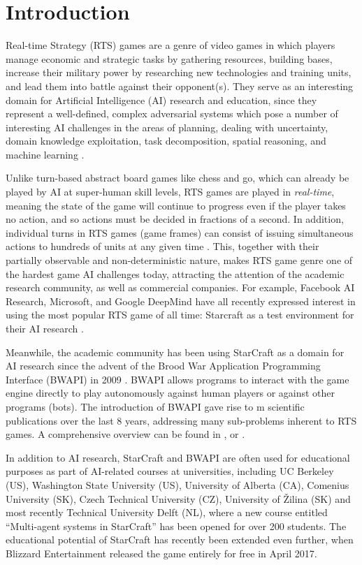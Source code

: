 \section{Introduction}\label{secIntro}

Real-time Strategy (RTS) games are a genre of video games in which players manage economic and strategic tasks by gathering resources, building bases, increase their military power by researching new technologies and training units, and lead them into battle against their opponent(s). They serve as an interesting domain for Artificial Intelligence (AI) research and education, since they represent a well-defined, complex adversarial systems \cite{Buro2004} which pose a number of interesting AI challenges in the areas of planning, dealing with uncertainty, domain knowledge exploitation, task decomposition, spatial reasoning, and machine learning \cite{Survey2013}.

Unlike turn-based abstract board games like chess and go, which can already be played by AI at super-human skill levels, RTS games are played in \textit{real-time}, meaning the state of the game will continue to progress even if the player takes no action, and so actions must be decided in fractions of a second. In addition, individual turns in RTS games (game frames) can consist of issuing simultaneous actions to hundreds of units at any given time \cite{buro2012real}. This, together with their partially observable and non-deterministic nature, makes RTS game genre one of the hardest game AI challenges today, attracting the attention of the academic research community, as well as commercial companies. For example, Facebook AI Research, Microsoft, and Google DeepMind have all recently expressed interest in using the most popular RTS game of all time: Starcraft as a test environment for their AI research \cite{gibney2016google}. 

Meanwhile, the academic community has been using StarCraft as a domain for AI research since the advent of the Brood War Application Programming Interface (BWAPI) in 2009 \cite{heinermann2013bwapi}. BWAPI allows programs to interact with the game engine directly to play autonomously against human players or against other programs (bots). The introduction of BWAPI gave rise to m scientific publications over the last 8 years, addressing many sub-problems inherent to RTS games. A comprehensive overview can be found in \cite{churchill2016starcraft}, \cite{ontanon2015rts} or \cite{Survey2013}.

In addition to AI research, StarCraft and BWAPI are often used for educational purposes as part of AI-related  courses at universities, including UC Berkeley (US), Washington State University (US), University of Alberta (CA), Comenius University (SK), Czech Technical University (CZ), University of \v{Z}ilina (SK) and most recently Technical University Delft (NL), where a new course entitled ``Multi-agent systems in StarCraft'' has been opened for over 200 students. The educational potential of StarCraft has recently been extended even further, when Blizzard Entertainment released the game entirely for free in April 2017.

